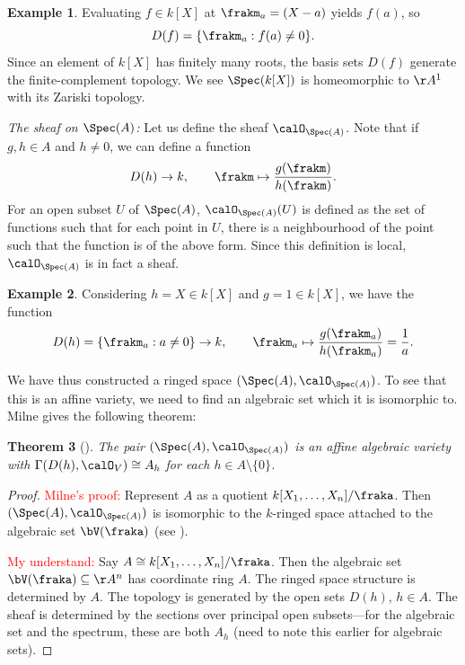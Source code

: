 \documentclass[12pt]{amsart}
\theoremstyle{plain}
\newtheorem{theorem}{Theorem}[subsection]
\theoremstyle{definition}
\newtheorem{example}[theorem]{Example}
\begin{document}
\begin{example}
Evaluating $f \in k[X]$ at $\frakm_a=(X-a)$ yields $f(a)$, so 
$$D(f) = \{\frakm_a : f(a) \ne 0\}.$$
Since an element of $k[X]$ has finitely many roots, the basis sets $D(f)$ generate the finite-complement topology.
We see $\Spec(k[X])$ is homeomorphic to $\AA^1$ with its Zariski topology.
\end{example}

\emph{The sheaf on $\Spec(A)$:}
Let us define the sheaf $\calO_{\Spec(A)}$.
Note that if $g, h\in A$ and $h \ne 0$, we can define a function
$$D(h) \to k, \qquad \frakm \mapsto \frac{g(\frakm)}{h(\frakm)}.$$
For an open subset $U$ of $\Spec(A)$, $\calO_{\Spec(A)}(U)$ is defined as the set of functions such that for each point in $U$, there is a neighbourhood of the point such that the function is of the above form.
Since this definition is local, $\calO_{\Spec(A)}$ is in fact a sheaf.

\begin{example}
Considering $h = X \in k[X]$ and $g=1\in k[X]$, we have the function 
$$D(h) =\{\frakm_a : a \ne 0\} \to k, \qquad \frakm_a \mapsto \frac{g(\frakm_a)}{h(\frakm_a)} = \frac{1}{a}.$$
\end{example}

We have thus constructed a ringed space $(\Spec(A), \calO_{\Spec(A)})$.
To see that this is an affine variety, we need to find an algebraic set which it is isomorphic to.
Milne gives the following theorem:

\begin{theorem}[{\cite[Proposition 3.22]{Milne13}}]
The pair $(\Spec(A), \calO_{\Spec(A)})$ is an affine algebraic variety with $\Gamma(D(h), \calO_V) \cong A_h$ for each $h \in A\setminus\{0\}$.
\end{theorem}
\begin{proof}
\textcolor{red}{Milne's proof:}
Represent $A$ as a quotient $k[X_1,\ldots,X_n]/\fraka$.
Then $(\Spec(A), \calO_{\Spec(A)})$ is isomorphic to the $k$-ringed space attached to the algebraic set $\bV(\fraka)$ (see \cite[3.15]{Milne13}).

\textcolor{red}{My understand:}
Say $A \cong k[X_1,\ldots,X_n]/\fraka$.
Then the algebraic set $\bV(\fraka) \subseteq \AA^n$ has coordinate ring $A$.
The ringed space structure is determined by $A$.
The topology is generated by the open sets $D(h)$, $h \in A$.
The sheaf is determined by the sections over principal open subsets---for the algebraic set and the spectrum, these are both $A_h$ (need to note this earlier for algebraic sets).
\end{proof}
\end{document}
